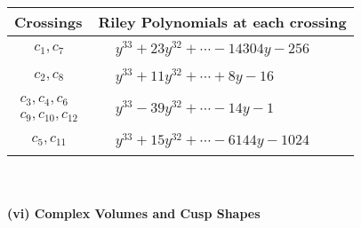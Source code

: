 \documentclass[1p]{elsarticle_modified}
\theoremstyle{definition}
\begin{document}
\begin{tabular}{m{50pt}|m{274pt}}
Crossings & \hspace{64pt}Riley Polynomials at each crossing \\
\hline $$\begin{aligned}c_{1},c_{7}\end{aligned}$$&$\begin{aligned}
&y^{33}+23 y^{32}+\cdots-14304 y-256
\end{aligned}$\\
\hline $$\begin{aligned}c_{2},c_{8}\end{aligned}$$&$\begin{aligned}
&y^{33}+11 y^{32}+\cdots+8 y-16
\end{aligned}$\\
\hline $$\begin{aligned}c_{3},c_{4},c_{6}\\c_{9},c_{10},c_{12}\end{aligned}$$&$\begin{aligned}
&y^{33}-39 y^{32}+\cdots-14 y-1
\end{aligned}$\\
\hline $$\begin{aligned}c_{5},c_{11}\end{aligned}$$&$\begin{aligned}
&y^{33}+15 y^{32}+\cdots-6144 y-1024
\end{aligned}$\\
\hline
\end{tabular}\\~\\
\newpage\flushleft \textbf{(vi) Complex Volumes and Cusp Shapes}
\end{document}
